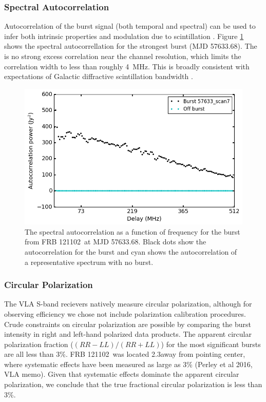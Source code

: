 \documentclass[twocolumn]{aastex61}
\newcommand{\frb}{FRB 121102}
\begin{document}


\subsubsection{Spectral Autocorrelation}
\label{sec:auto}
Autocorrelation of the burst signal (both temporal and spectral) can be used to infer both intrinsic properties and modulation due to scintillation \citep{CORDES}. Figure \ref{fig:acf} shows the spectral autocorrellation for the strongest burst (MJD 57633.68). The is no strong excess correlation near the channel resolution, which limits the correlation width to less than roughly 4~MHz. This is broadly consistent with expectations of Galactic diffractive scintillation bandwidth \citep[3--9~MHz near 3~GHz][]{2002astro.ph..7156C}.

\begin{figure}[htb]
\begin{center}
\includegraphics[width=0.9\columnwidth]{acf_57633_scan7}
\caption{The spectral autocorrelation as a function of frequency for the burst from \frb\ at MJD 57633.68. Black dots show the autocorrelation for the burst and cyan shows the autocorrelation of a representative spectrum with no burst.
\label{fig:acf}}
\end{center}
\end{figure}

\subsubsection{Circular Polarization}
The VLA S-band recievers natively measure circular polarization, although for observing efficiency we chose not include polarization calibration procedures. Crude constraints on circular polarization are possible by comparing the burst intensity in right and left-hand polarized data products. The apparent circular polarization fraction ($(RR-LL)/(RR+LL)$) for the most significant bursts are all less than 3\%. \frb\ was located 2.3\arcmin away from pointing center, where systematic effects have been measured as large as 3\% (Perley et al 2016, VLA memo). Given that systematic effects dominate the apparent circular polarization, we conclude that the true fractional circular polarization is less than 3\%.
\end{document}
